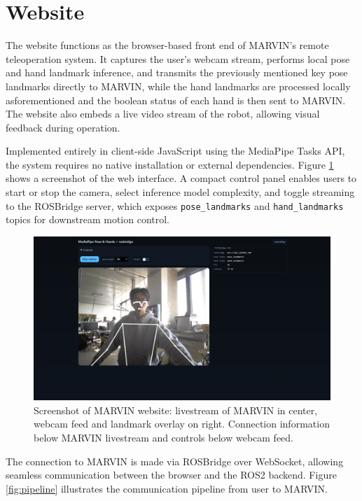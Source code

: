 \documentclass[acmsmall, screen]{acmart}
\begin{document}
\section{Website}
The website functions as the browser-based front end of MARVIN’s remote teleoperation system. It captures the user’s webcam stream, performs local pose and hand landmark inference, and transmits the previously mentioned key pose landmarks directly to MARVIN, while the hand landmarks are processed locally asforementioned and the boolean status of each hand is then sent to MARVIN. The website also embeds a live video stream of the robot, allowing visual feedback during operation. 

Implemented entirely in client-side JavaScript using the MediaPipe Tasks API, the system requires no native installation or external dependencies. Figure \ref{fig:web} shows a screenshot of the web interface. A compact control panel enables users to start or stop the camera, select inference model complexity, and toggle streaming to the ROSBridge server, which exposes \texttt{pose\_landmarks} and \texttt{hand\_landmarks} topics for downstream motion control.

\begin{figure}[htbp]
  \centering
  \includegraphics[width=\linewidth]{assets/web}
  \caption{Screenshot of MARVIN website: livestream of MARVIN in center, webcam feed and landmark overlay on right. Connection information below MARVIN livestream and controls below webcam feed.}
  \label{fig:web}
\end{figure}

The connection to MARVIN is made via ROSBridge over WebSocket, allowing seamless communication between the browser and the ROS2 backend. Figure \ref{fig:pipeline} illustrates the communication pipeline from user to MARVIN.
\end{document}
